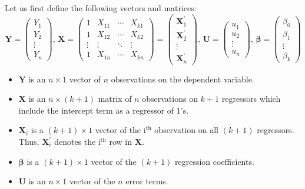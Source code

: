 \documentclass[a4paper,11pt]{article}
\begin{document}
Let us first define the following vectors and matrices:
\begin{equation*}
\mathbf{Y} =
\begin{pmatrix}
Y_1 \\
Y_2 \\
\vdots \\
Y_n
\end{pmatrix},\,
\mathbf{X} =
\begin{pmatrix}
1 & X_{11} & \cdots & X_{k1} \\
1 & X_{12} & \cdots & X_{k2} \\
\vdots & \vdots & \ddots & \vdots \\
1 & X_{1n} & \cdots & X_{kn}
\end{pmatrix}
=
\begin{pmatrix}
\mathbf{X}^{\prime}_1 \\
\mathbf{X}^{\prime}_2 \\
\vdots \\
\mathbf{X}^{\prime}_n
\end{pmatrix},\,
\mathbf{U} =
\begin{pmatrix}
u_1 \\
u_2 \\
\vdots \\
u_n
\end{pmatrix},\,
\boldsymbol{\beta} =
\begin{pmatrix}
\beta_0 \\
\beta_1 \\
\vdots \\
\beta_k
\end{pmatrix}
\end{equation*}

\begin{itemize}
\item \(\mathbf{Y}\) is an \(n \times 1\) vector of \(n\) observations on the
dependent variable.
\item \(\mathbf{X}\) is an \(n \times (k+1)\) matrix of \(n\) observations on
\(k + 1\) regressors which include the intercept term as a regressor of
1's.
\item \(\mathbf{X}_i\) is a \((k+1) \times 1\) vector of the i\(^{\text{th}}\)
observation on all \((k+1)\) regressors. Thus,
\(\mathbf{X}^{\prime}_i\) denotes the i\(^{\text{th}}\) row in \(\mathbf{X}\).
\item \(\boldsymbol{\beta}\) is a \((k+1) \times 1\) vector of the \((k+1)\)
regression coefficients.
\item \(\mathbf{U}\) is an \(n \times 1\) vector of the \(n\) error terms.
\end{itemize}
\end{document}
